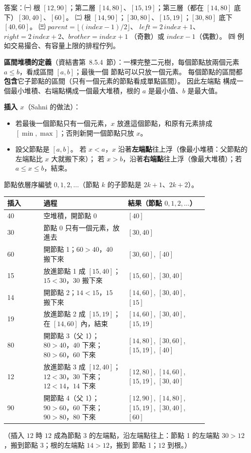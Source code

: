 \begin{pastsoln}
答案：㈠ 根 $[12, 90]$；第二層 $[14, 80]$、$[15, 19]$；第三層（都在 $[14, 80]$ 底下）$[30, 40]$、$[60]$。 ㈡ 根
$[14, 90]$；$[30, 80]$、$[15, 19]$；$[30, 80]$ 底下 $[40, 60]$。 ㈢ $\mathit{parent} = \lfloor(\mathit{index}-1)/2\rfloor$、
$\mathit{left} = 2\,\mathit{index} + 1$、$\mathit{right} = 2\,\mathit{index} + 2$、$\mathit{brother} = \mathit{index} + 1$
（奇數）或 $\mathit{index} - 1$（偶數）。 ㈣ 例如交易撮合、有容量上限的排程佇列。

\textbf{區間堆積的定義}（資結書第~8.5.4~節）：一棵完整二元樹，每個節點放兩個元素 $a \le b$，看成區間 $[a, b]$；最後一個
節點可以只放一個元素。 每個節點的區間都\textbf{包含}它子節點的區間（只有一個元素的節點看成單點區間）。 因此左端點
構成一個最小堆積、右端點構成一個最大堆積，根的 $a$ 是最小值、$b$ 是最大值。

\textbf{插入 $x$}（Sahni 的做法）：
\begin{itemize}
\item 若最後一個節點只有一個元素，$x$ 放進這個節點，和原有元素排成 $[\min, \max]$；否則新開一個節點只放 $x$。
\item 設父節點是 $[a, b]$。 若 $x < a$，$x$ 沿著\textbf{左端點}往上浮（像最小堆積：父節點的左端點比 $x$ 大就搬下來）；
若 $x > b$，沿著\textbf{右端點}往上浮（像最大堆積）；若 $a \le x \le b$，結束。
\end{itemize}
節點依層序編號 $0, 1, 2, \ldots$（節點 $k$ 的子節點是 $2k+1$、$2k+2$）。
\begin{center}
\small
\begin{tabular}{l>{\raggedright\arraybackslash}p{0.42\linewidth}>{\raggedright\arraybackslash}p{0.40\linewidth}}
\toprule
插入 & 過程 & 結果（節點 $0, 1, 2, \ldots$） \\
\midrule
40 & 空堆積，開節點 0 & $[40]$ \\
30 & 節點 0 只有一個元素，放進去 & $[30, 40]$ \\
60 & 開節點 1；$60 > 40$，$40$ 搬下來 & $[30, 60]$, $[40]$ \\
15 & 放進節點 1 成 $[15, 40]$；$15 < 30$，$30$ 搬下來 & $[15, 60]$, $[30, 40]$ \\
14 & 開節點 2；$14 < 15$，$15$ 搬下來 & $[14, 60]$, $[30, 40]$, $[15]$ \\
19 & 放進節點 2 成 $[15, 19]$；在 $[14, 60]$ 內，結束 & $[14, 60]$, $[30, 40]$, $[15, 19]$ \\
80 & 開節點 3（父 1）；$80 > 40$，$40$ 下來；$80 > 60$，$60$ 下來 & $[14, 80]$, $[30, 60]$, $[15, 19]$, $[40]$ \\
12 & 放進節點 3 成 $[12, 40]$；$12 < 30$，$30$ 下來；$12 < 14$，$14$ 下來 & $[12, 80]$, $[14, 60]$, $[15, 19]$, $[30, 40]$ \\
90 & 開節點 4（父 1）；$90 > 60$，$60$ 下來；$90 > 80$，$80$ 下來 & $[12, 90]$, $[14, 80]$, $[15, 19]$, $[30, 40]$, $[60]$ \\
\bottomrule
\end{tabular}
\end{center}
（插入 $12$ 時 $12$ 成為節點 3 的左端點，沿左端點往上：節點 1 的左端點 $30 > 12$，搬到節點 3；根的左端點 $14 > 12$，搬到
節點 1；$12$ 到根。）


\end{pastsoln}
